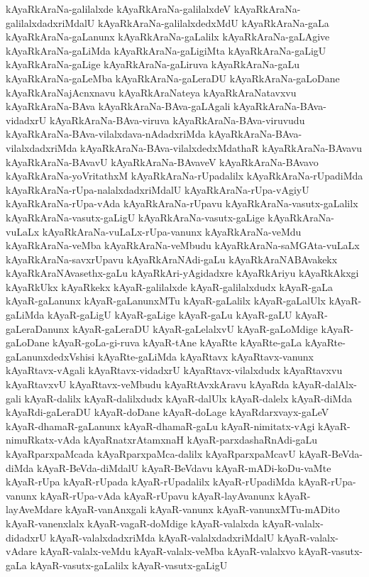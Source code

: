 {kAyaRkAraNa-galilalxde
kAyaRkAraNa-galilalxdeV
kAyaRkAraNa-galilalxdadxriMdalU
kAyaRkAraNa-galilalxdedxMdU
kAyaRkAraNa-gaLa
kAyaRkAraNa-gaLanunx
kAyaRkAraNa-gaLalilx
kAyaRkAraNa-gaLAgive
kAyaRkAraNa-gaLiMda
kAyaRkAraNa-gaLigiMta
kAyaRkAraNa-gaLigU
kAyaRkAraNa-gaLige
kAyaRkAraNa-gaLiruva
kAyaRkAraNa-gaLu
kAyaRkAraNa-gaLeMba
kAyaRkAraNa-gaLeraDU
kAyaRkAraNa-gaLoDane
kAyaRkAraNajAcnxnavu
kAyaRkAraNateya
kAyaRkAraNatavxvu
kAyaRkAraNa-BAva
kAyaRkAraNa-BAva-gaLAgali
kAyaRkAraNa-BAva-vidadxrU
kAyaRkAraNa-BAva-viruva
kAyaRkAraNa-BAva-viruvudu
kAyaRkAraNa-BAva-vilalxdava-nAdadxriMda
kAyaRkAraNa-BAva-vilalxdadxriMda
kAyaRkAraNa-BAva-vilalxdedxMdathaR
kAyaRkAraNa-BAvavu
kAyaRkAraNa-BAvavU
kAyaRkAraNa-BAvaveV
kAyaRkAraNa-BAvavo
kAyaRkAraNa-yoVritathxM
kAyaRkAraNa-rUpadalilx
kAyaRkAraNa-rUpadiMda
kAyaRkAraNa-rUpa-nalalxdadxriMdalU
kAyaRkAraNa-rUpa-vAgiyU
kAyaRkAraNa-rUpa-vAda
kAyaRkAraNa-rUpavu
kAyaRkAraNa-vasutx-gaLalilx
kAyaRkAraNa-vasutx-gaLigU
kAyaRkAraNa-vasutx-gaLige
kAyaRkAraNa-vuLaLx
kAyaRkAraNa-vuLaLx-rUpa-vanunx
kAyaRkAraNa-veMdu
kAyaRkAraNa-veMba
kAyaRkAraNa-veMbudu
kAyaRkAraNa-saMGAta-vuLaLx
kAyaRkAraNa-savxrUpavu
kAyaRkAraNAdi-gaLu
kAyaRkAraNABAvakekx
kAyaRkAraNAvasethx-gaLu
kAyaRkAri-yAgidadxre
kAyaRkAriyu
kAyaRkAkxgi
kAyaRkUkx
kAyaRkekx
kAyaR-galilalxde
kAyaR-galilalxdudx
kAyaR-gaLa
kAyaR-gaLanunx
kAyaR-gaLanunxMTu
kAyaR-gaLalilx
kAyaR-gaLalUlx
kAyaR-gaLiMda
kAyaR-gaLigU
kAyaR-gaLige
kAyaR-gaLu
kAyaR-gaLU
kAyaR-gaLeraDanunx
kAyaR-gaLeraDU
kAyaR-gaLelalxvU
kAyaR-gaLoMdige
kAyaR-gaLoDane
kAyaR-goLa-gi-ruva
kAyaR-tAne
kAyaRte
kAyaRte-gaLa
kAyaRte-gaLanunxdedxVshisi
kAyaRte-gaLiMda
kAyaRtavx
kAyaRtavx-vanunx
kAyaRtavx-vAgali
kAyaRtavx-vidadxrU
kAyaRtavx-vilalxdudx
kAyaRtavxvu
kAyaRtavxvU
kAyaRtavx-veMbudu
kAyaRtAvxkAravu
kAyaRda
kAyaR-dalAlx-gali
kAyaR-dalilx
kAyaR-dalilxdudx
kAyaR-dalUlx
kAyaR-dalelx
kAyaR-diMda
kAyaRdi-gaLeraDU
kAyaR-doDane
kAyaR-doLage
kAyaRdarxvayx-gaLeV
kAyaR-dhamaR-gaLanunx
kAyaR-dhamaR-gaLu
kAyaR-nimitatx-vAgi
kAyaR-nimuRkatx-vAda
kAyaRnatxrAtamxnaH
kAyaR-parxdashaRnAdi-gaLu
kAyaRparxpaMcada
kAyaRparxpaMca-dalilx
kAyaRparxpaMcavU
kAyaR-BeVda-diMda
kAyaR-BeVda-diMdalU
kAyaR-BeVdavu
kAyaR-mADi-koDu-vaMte
kAyaR-rUpa
kAyaR-rUpada
kAyaR-rUpadalilx
kAyaR-rUpadiMda
kAyaR-rUpa-vanunx
kAyaR-rUpa-vAda
kAyaR-rUpavu
kAyaR-layAvanunx
kAyaR-layAveMdare
kAyaR-vanAnxgali
kAyaR-vanunx
kAyaR-vanunxMTu-mADito
kAyaR-vanenxlalx
kAyaR-vagaR-doMdige
kAyaR-valalxda
kAyaR-valalx-didadxrU
kAyaR-valalxdadxriMda
kAyaR-valalxdadxriMdalU
kAyaR-valalx-vAdare
kAyaR-valalx-veMdu
kAyaR-valalx-veMba
kAyaR-valalxvo
kAyaR-vasutx-gaLa
kAyaR-vasutx-gaLalilx
kAyaR-vasutx-gaLigU
}

